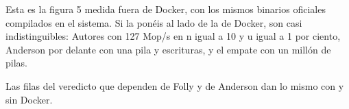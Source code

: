 Esta es la figura 5 medida fuera de Docker, con los mismos binarios oficiales compilados en el sistema. Si la ponéis al lado de la de Docker, son casi indistinguibles: Autores con 127 Mop/s en n igual a 10 y u igual a 1 por ciento, Anderson por delante con una pila y escrituras, y el empate con un millón de pilas.

Las filas del veredicto que dependen de Folly y de Anderson dan lo mismo con y sin Docker.
